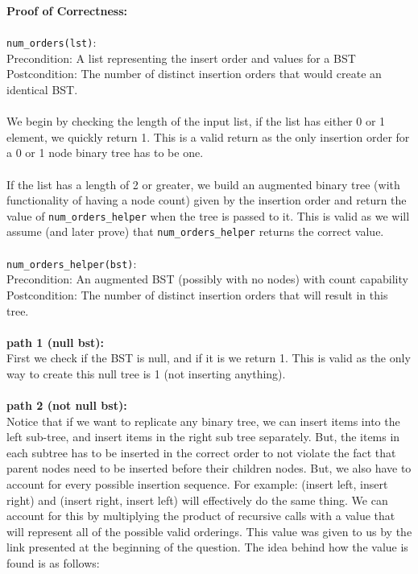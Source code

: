 \documentclass{assignment-263}
\begin{document}
\begin{enumerate}
\textbf{Proof of Correctness:}\\\\
\verb|num_orders(lst)|:\\
Precondition: A list representing the insert order and values for a BST\\
Postcondition: The number of distinct insertion orders that would create
an identical BST.\\\\
We begin by checking the length of the input list, if the list has either 0 or 1 element, we quickly return 1. This is a valid return as the only insertion order for a 0 or 1 node binary tree has to be one.\\\\
If the list has a length of 2 or greater, we build an augmented binary tree (with functionality of having a node count) given by the insertion order and return the value of \verb|num_orders_helper| when the tree is passed to it. This is valid as we will assume (and later prove) that \verb|num_orders_helper| returns the correct value.\\\\
\verb|num_orders_helper(bst)|:\\
Precondition: An augmented BST (possibly with no nodes) with count capability\\
Postcondition: The number of distinct insertion orders that will result in this tree.\\\\
\textbf{path 1 (null bst):}\\
First we check if the BST is null, and if it is we return 1. This is valid as the only way to create this null tree is 1 (not inserting anything).\\\\
\textbf{path 2 (not null bst):}\\
Notice that if we want to replicate any binary tree, we can insert items into the left sub-tree, and insert items in the right sub tree separately. But, the items in each subtree has to be inserted in the correct order to not violate the fact that parent nodes need to be inserted before their children nodes. But, we also have to account for every possible insertion sequence. For example: (insert left, insert right) and (insert right, insert left) will effectively do the same thing. We can account for this by multiplying the product of recursive calls with a value that will represent all of the possible valid orderings. This value was given to us by the link presented at the beginning of the question. The idea behind how the value is found is as follows:\\\\

\end{enumerate}
\end{document}
